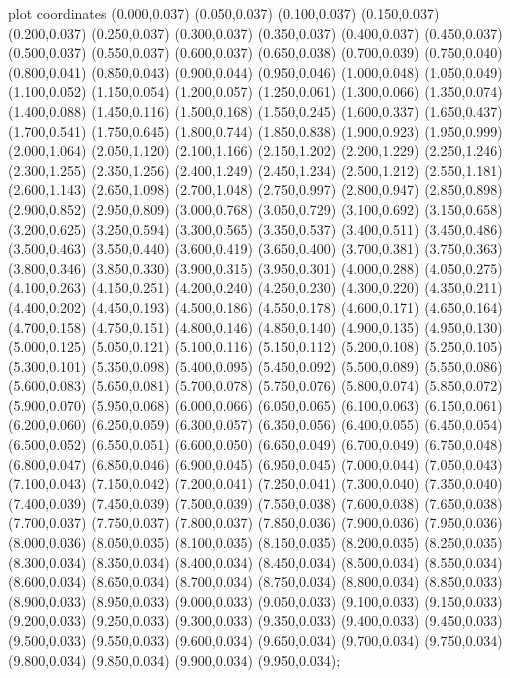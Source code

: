  plot coordinates {(0.000,0.037) (0.050,0.037) (0.100,0.037) (0.150,0.037) (0.200,0.037) (0.250,0.037) (0.300,0.037) (0.350,0.037) (0.400,0.037) (0.450,0.037) (0.500,0.037) (0.550,0.037) (0.600,0.037) (0.650,0.038) (0.700,0.039) (0.750,0.040) (0.800,0.041) (0.850,0.043) (0.900,0.044) (0.950,0.046) (1.000,0.048) (1.050,0.049) (1.100,0.052) (1.150,0.054) (1.200,0.057) (1.250,0.061) (1.300,0.066) (1.350,0.074) (1.400,0.088) (1.450,0.116) (1.500,0.168) (1.550,0.245) (1.600,0.337) (1.650,0.437) (1.700,0.541) (1.750,0.645) (1.800,0.744) (1.850,0.838) (1.900,0.923) (1.950,0.999) (2.000,1.064) (2.050,1.120) (2.100,1.166) (2.150,1.202) (2.200,1.229) (2.250,1.246) (2.300,1.255) (2.350,1.256) (2.400,1.249) (2.450,1.234) (2.500,1.212) (2.550,1.181) (2.600,1.143) (2.650,1.098) (2.700,1.048) (2.750,0.997) (2.800,0.947) (2.850,0.898) (2.900,0.852) (2.950,0.809) (3.000,0.768) (3.050,0.729) (3.100,0.692) (3.150,0.658) (3.200,0.625) (3.250,0.594) (3.300,0.565) (3.350,0.537) (3.400,0.511) (3.450,0.486) (3.500,0.463) (3.550,0.440) (3.600,0.419) (3.650,0.400) (3.700,0.381) (3.750,0.363) (3.800,0.346) (3.850,0.330) (3.900,0.315) (3.950,0.301) (4.000,0.288) (4.050,0.275) (4.100,0.263) (4.150,0.251) (4.200,0.240) (4.250,0.230) (4.300,0.220) (4.350,0.211) (4.400,0.202) (4.450,0.193) (4.500,0.186) (4.550,0.178) (4.600,0.171) (4.650,0.164) (4.700,0.158) (4.750,0.151) (4.800,0.146) (4.850,0.140) (4.900,0.135) (4.950,0.130) (5.000,0.125) (5.050,0.121) (5.100,0.116) (5.150,0.112) (5.200,0.108) (5.250,0.105) (5.300,0.101) (5.350,0.098) (5.400,0.095) (5.450,0.092) (5.500,0.089) (5.550,0.086) (5.600,0.083) (5.650,0.081) (5.700,0.078) (5.750,0.076) (5.800,0.074) (5.850,0.072) (5.900,0.070) (5.950,0.068) (6.000,0.066) (6.050,0.065) (6.100,0.063) (6.150,0.061) (6.200,0.060) (6.250,0.059) (6.300,0.057) (6.350,0.056) (6.400,0.055) (6.450,0.054) (6.500,0.052) (6.550,0.051) (6.600,0.050) (6.650,0.049) (6.700,0.049) (6.750,0.048) (6.800,0.047) (6.850,0.046) (6.900,0.045) (6.950,0.045) (7.000,0.044) (7.050,0.043) (7.100,0.043) (7.150,0.042) (7.200,0.041) (7.250,0.041) (7.300,0.040) (7.350,0.040) (7.400,0.039) (7.450,0.039) (7.500,0.039) (7.550,0.038) (7.600,0.038) (7.650,0.038) (7.700,0.037) (7.750,0.037) (7.800,0.037) (7.850,0.036) (7.900,0.036) (7.950,0.036) (8.000,0.036) (8.050,0.035) (8.100,0.035) (8.150,0.035) (8.200,0.035) (8.250,0.035) (8.300,0.034) (8.350,0.034) (8.400,0.034) (8.450,0.034) (8.500,0.034) (8.550,0.034) (8.600,0.034) (8.650,0.034) (8.700,0.034) (8.750,0.034) (8.800,0.034) (8.850,0.033) (8.900,0.033) (8.950,0.033) (9.000,0.033) (9.050,0.033) (9.100,0.033) (9.150,0.033) (9.200,0.033) (9.250,0.033) (9.300,0.033) (9.350,0.033) (9.400,0.033) (9.450,0.033) (9.500,0.033) (9.550,0.033) (9.600,0.034) (9.650,0.034) (9.700,0.034) (9.750,0.034) (9.800,0.034) (9.850,0.034) (9.900,0.034) (9.950,0.034)};
